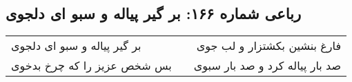 \begin{center}
\section*{رباعی شماره ۱۶۶: بر گیر پیاله و سبو ای دلجوی}
\label{sec:sh166}
\begin{longtable}{l p{0.5cm} r}
بر گیر پیاله و سبو ای دلجوی
&&
فارغ بنشین بکشتزار و لب جوی
\\
بس شخص عزیز را که چرخ بدخوی
&&
صد بار پیاله کرد و صد بار سبوی
\\
\end{longtable}
\end{center}
